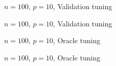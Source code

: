 \documentclass{article}
\begin{document}
\begin{figure}[p]
\centering
$n=100$, $p=10$, Validation tuning \\

\end{figure}

\begin{figure}[p]
\centering
$n=100$, $p=10$, Validation tuning \\

\end{figure}

\begin{figure}[p]
\centering
$n=100$, $p=10$, Oracle tuning \\

\end{figure}

\begin{figure}[p]
\centering
$n=100$, $p=10$, Oracle tuning \\

\end{figure}
\end{document}
